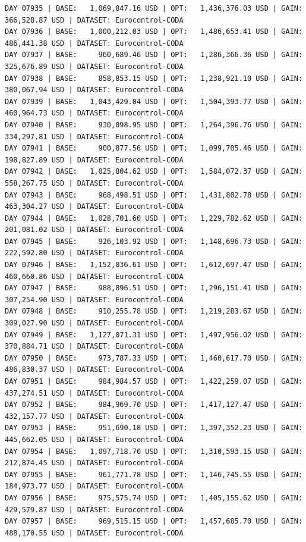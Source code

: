 \documentclass[11pt,a4paper]{article}
\begin{document}
\begin{verbatim}
DAY 07935 | BASE:   1,069,847.16 USD | OPT:   1,436,376.03 USD | GAIN: 366,528.87 USD | DATASET: Eurocontrol-CODA
DAY 07936 | BASE:   1,000,212.03 USD | OPT:   1,486,653.41 USD | GAIN: 486,441.38 USD | DATASET: Eurocontrol-CODA
DAY 07937 | BASE:     960,689.46 USD | OPT:   1,286,366.36 USD | GAIN: 325,676.89 USD | DATASET: Eurocontrol-CODA
DAY 07938 | BASE:     858,853.15 USD | OPT:   1,238,921.10 USD | GAIN: 380,067.94 USD | DATASET: Eurocontrol-CODA
DAY 07939 | BASE:   1,043,429.04 USD | OPT:   1,504,393.77 USD | GAIN: 460,964.73 USD | DATASET: Eurocontrol-CODA
DAY 07940 | BASE:     930,098.95 USD | OPT:   1,264,396.76 USD | GAIN: 334,297.81 USD | DATASET: Eurocontrol-CODA
DAY 07941 | BASE:     900,877.56 USD | OPT:   1,099,705.46 USD | GAIN: 198,827.89 USD | DATASET: Eurocontrol-CODA
DAY 07942 | BASE:   1,025,804.62 USD | OPT:   1,584,072.37 USD | GAIN: 558,267.75 USD | DATASET: Eurocontrol-CODA
DAY 07943 | BASE:     968,498.51 USD | OPT:   1,431,802.78 USD | GAIN: 463,304.27 USD | DATASET: Eurocontrol-CODA
DAY 07944 | BASE:   1,028,701.60 USD | OPT:   1,229,782.62 USD | GAIN: 201,081.02 USD | DATASET: Eurocontrol-CODA
DAY 07945 | BASE:     926,103.92 USD | OPT:   1,148,696.73 USD | GAIN: 222,592.80 USD | DATASET: Eurocontrol-CODA
DAY 07946 | BASE:   1,152,036.61 USD | OPT:   1,612,697.47 USD | GAIN: 460,660.86 USD | DATASET: Eurocontrol-CODA
DAY 07947 | BASE:     988,896.51 USD | OPT:   1,296,151.41 USD | GAIN: 307,254.90 USD | DATASET: Eurocontrol-CODA
DAY 07948 | BASE:     910,255.78 USD | OPT:   1,219,283.67 USD | GAIN: 309,027.90 USD | DATASET: Eurocontrol-CODA
DAY 07949 | BASE:   1,127,071.31 USD | OPT:   1,497,956.02 USD | GAIN: 370,884.71 USD | DATASET: Eurocontrol-CODA
DAY 07950 | BASE:     973,787.33 USD | OPT:   1,460,617.70 USD | GAIN: 486,830.37 USD | DATASET: Eurocontrol-CODA
DAY 07951 | BASE:     984,984.57 USD | OPT:   1,422,259.07 USD | GAIN: 437,274.51 USD | DATASET: Eurocontrol-CODA
DAY 07952 | BASE:     984,969.70 USD | OPT:   1,417,127.47 USD | GAIN: 432,157.77 USD | DATASET: Eurocontrol-CODA
DAY 07953 | BASE:     951,690.18 USD | OPT:   1,397,352.23 USD | GAIN: 445,662.05 USD | DATASET: Eurocontrol-CODA
DAY 07954 | BASE:   1,097,718.70 USD | OPT:   1,310,593.15 USD | GAIN: 212,874.45 USD | DATASET: Eurocontrol-CODA
DAY 07955 | BASE:     961,771.78 USD | OPT:   1,146,745.55 USD | GAIN: 184,973.77 USD | DATASET: Eurocontrol-CODA
DAY 07956 | BASE:     975,575.74 USD | OPT:   1,405,155.62 USD | GAIN: 429,579.87 USD | DATASET: Eurocontrol-CODA
DAY 07957 | BASE:     969,515.15 USD | OPT:   1,457,685.70 USD | GAIN: 488,170.55 USD | DATASET: Eurocontrol-CODA

\end{verbatim}
\end{document}
